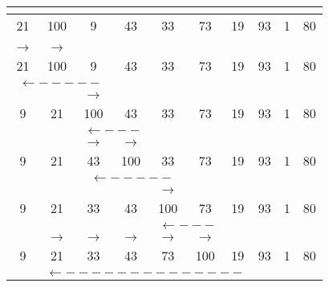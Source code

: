 \documentclass[a4paper, 9pt]{article}
\begin{document}
    \begin{center}
        \begin{tabular}{|c|c|c|c|c|c|c|c|c|c|}
          
          \multicolumn{10}{c}{} \\ \hline
          \rowcolor{green!70} 21 & \rowcolor{red!70} 100 & 9 & 43 & 33 & 73 & 19 & 93 & 1 & 80 \\ \hline
          \multicolumn{10}{c}{}\\
          
          
          \multicolumn{1}{c}{$ \rightarrow $} & \multicolumn{1}{c}{$ \rightarrow $} & \multicolumn{8}{c}{} \\ \hline
          \rowcolor{green!70} 21 & 100 & \rowcolor{red!70} 9 & 43 & 33 & 73 & 19 & 93 & 1 & 80 \\ \hline
          \multicolumn{3}{c}{$ \leftarrow ----- $} & \multicolumn{7}{c}{}\\
          
          
          \multicolumn{2}{c}{} & \multicolumn{1}{c}{$ \rightarrow $} & \multicolumn{7}{c}{}\\ \hline
          \rowcolor{green!70} 9 & 21 & 100 & \rowcolor{red!70} 43 & 33 & 73 & 19 & 93 & 1 & 80 \\ \hline
          \multicolumn{2}{c}{} & \multicolumn{2}{c}{$ \leftarrow --- $} &  \multicolumn{6}{c}{}\\
          
         
          \multicolumn{2}{c}{} & \multicolumn{1}{c}{$ \rightarrow $} & \multicolumn{1}{c}{$ \rightarrow $} & \multicolumn{6}{c}{}\\ \hline
          \rowcolor{green!70} 9 & 21 & 43 & 100 & \rowcolor{red!70} 33 & 73 & 19 & 93 & 1 & 80 \\ \hline
          \multicolumn{2}{c}{} & \multicolumn{3}{c}{$ \leftarrow ----- $} &  \multicolumn{5}{c}{}\\
          
          
          \multicolumn{4}{c}{} & \multicolumn{1}{c}{$ \rightarrow $} & \multicolumn{5}{c}{}\\ \hline
          \rowcolor{green!70} 9 & 21 & 33 & 43 & 100 & \rowcolor{red!70} 73 & 19 & 93 & 1 & 80 \\ \hline
          \multicolumn{4}{c}{} & \multicolumn{2}{c}{$ \leftarrow --- $} &  \multicolumn{4}{c}{}\\
          
          
          \multicolumn{1}{c}{} & \multicolumn{1}{c}{$ \rightarrow $} & \multicolumn{1}{c}{$ \rightarrow $} & \multicolumn{1}{c}{$ \rightarrow $} & \multicolumn{1}{c}{$ \rightarrow $} & \multicolumn{1}{c}{$ \rightarrow $} & \multicolumn{3}{c}{}\\ \hline
          \rowcolor{green!70} 9 & 21 & 33 & 43 & 73 & 100 & \rowcolor{red!70} 19 & 93 & 1 & 80 \\ \hline
          \multicolumn{1}{c}{} & \multicolumn{6}{c}{$ \leftarrow -------------- $} &  \multicolumn{3}{c}{}\\
          

\end{tabular}
\end{center}
\end{document}
